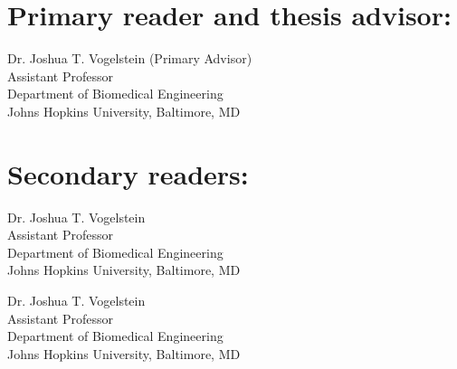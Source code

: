 





\begin{singlespace}

\section*{Primary reader and thesis advisor:}

Dr. Joshua T. Vogelstein (Primary Advisor)\\
Assistant Professor \\
Department of Biomedical Engineering\\
Johns Hopkins University, Baltimore, MD 



\section*{Secondary readers:}

Dr. Joshua T. Vogelstein \\
Assistant Professor \\
Department of Biomedical Engineering\\
Johns Hopkins University, Baltimore, MD 

\vspace{0.1in}

Dr. Joshua T. Vogelstein \\
Assistant Professor \\
Department of Biomedical Engineering\\
Johns Hopkins University, Baltimore, MD 


\end{singlespace}